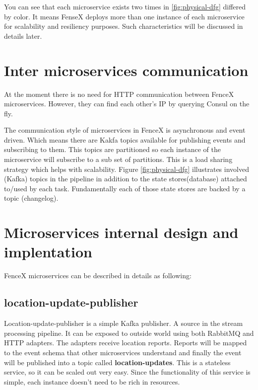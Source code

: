 \documentclass[a4]{report}
\begin{document}
    You can see that each microservice exists two times in \ref{fig:physical-dfg} differed by color.
    It means FenseX deploys more than one instance of each microservice for scalability and resiliency purposes.
    Such characteristics will be discussed in details later.

    \section{Inter microservices communication}
    At the moment there is no need for HTTP communication between FenceX microservices.
    However, they can find each other's IP by querying Consul on the fly.

    The communication style of microservices in FenceX is asynchronous and event driven.
    Which means there are Kakfa topics available for publishing events and subscribing to them.
    This topics are partitioned so each instance of the microservice will subscribe to a sub set of partitions.
    This is a load sharing strategy which helps with scalability.
    Figure \ref{fig:physical-dfg} illustrates involved (Kafka) topics in the pipeline in addition to the state
    stores(database) attached to/used by each task.
    Fundamentally each of those state stores are backed by a topic (changelog).


    \section{Microservices internal design and implentation}
    FenceX microservices can be described in details as following:

    \subsection{location-update-publisher}
    Location-update-publisher is a simple Kafka publisher.
    A source in the stream processing pipeline.
    It can be exposed to outside world using both RabbitMQ and HTTP adapters.
    The adapters receive location reports.
    Reports will be mapped to the event schema that other microservices
    understand and finally the event will be published into a topic called \textbf{location-updates}.
    This is a stateless service, so it can be scaled out very easy.
    Since the functionality of this service is simple, each instance doesn't need to be rich in resources.
\end{document}
